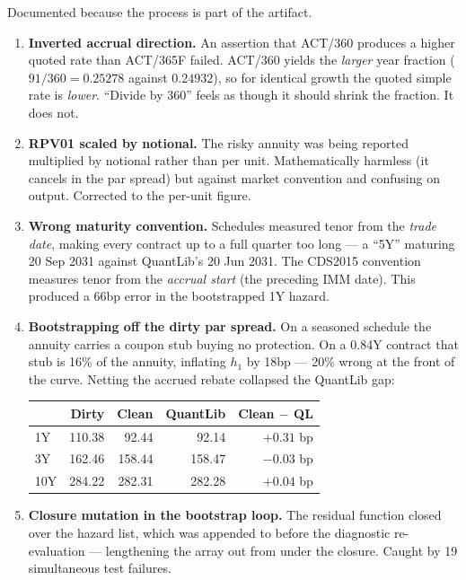\documentclass[11pt,a4paper]{article}
\begin{document}
Documented because the process is part of the artifact.

\begin{enumerate}[leftmargin=1.4em,itemsep=0.4em]
\item \textbf{Inverted accrual direction.} An assertion that ACT/360 produces a higher quoted
rate than ACT/365F failed. ACT/360 yields the \emph{larger} year fraction
($91/360 = 0.25278$ against $0.24932$), so for identical growth the quoted simple rate is
\emph{lower}. ``Divide by 360'' feels as though it should shrink the fraction. It does not.

\item \textbf{RPV01 scaled by notional.} The risky annuity was being reported multiplied by
notional rather than per unit. Mathematically harmless (it cancels in the par spread) but
against market convention and confusing on output. Corrected to the per-unit figure.

\item \textbf{Wrong maturity convention.} Schedules measured tenor from the \emph{trade date},
making every contract up to a full quarter too long --- a ``5Y'' maturing 20 Sep 2031 against
QuantLib's 20 Jun 2031. The CDS2015 convention measures tenor from the \emph{accrual start}
(the preceding IMM date). This produced a 66bp error in the bootstrapped 1Y hazard.

\item \textbf{Bootstrapping off the dirty par spread.} On a seasoned schedule the annuity
carries a coupon stub buying no protection. On a 0.84Y contract that stub is 16\% of the
annuity, inflating $h_1$ by 18bp --- 20\% wrong at the front of the curve. Netting the accrued
rebate collapsed the QuantLib gap:

\begin{center}
\begin{tabular}{lrrrr}
\toprule
& \textbf{Dirty} & \textbf{Clean} & \textbf{QuantLib} & \textbf{Clean $-$ QL} \\
\midrule
1Y  & 110.38 & 92.44  & 92.14  & $+0.31$ bp \\
3Y  & 162.46 & 158.44 & 158.47 & $-0.03$ bp \\
10Y & 284.22 & 282.31 & 282.28 & $+0.04$ bp \\
\bottomrule
\end{tabular}
\end{center}

\item \textbf{Closure mutation in the bootstrap loop.} The residual function closed over the
hazard list, which was appended to before the diagnostic re-evaluation --- lengthening the
array out from under the closure. Caught by 19 simultaneous test failures.


\end{enumerate}
\end{document}
